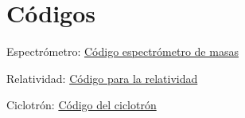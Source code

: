 \documentclass{article}
\begin{document}
\clearpage
\section{Códigos}
Espectrómetro: \href{https://drive.google.com/file/d/1POTN37wFfRKkrrgz9a6X_jpjA8OC4kvs/view?usp=sharing}{Código espectrómetro de masas} 

\vspace{.3cm}
Relatividad: \href{https://colab.research.google.com/drive/10xDyIfiMp-wUHr9GvP8pyn52G2KDsUSn?usp=sharing}{Código para la relatividad} 

\vspace{.3cm}

Ciclotrón: \href{https://colab.research.google.com/drive/1RwmH6mzifx4BxK_OHAIchd6x02lqrsi5?usp=sharing}{Código del ciclotrón} 
\end{document}
